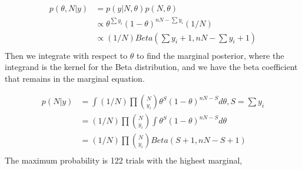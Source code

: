 \documentclass[
]{book}
\theoremstyle{definition}
\theoremstyle{definition}
\theoremstyle{definition}
\theoremstyle{definition}
\theoremstyle{remark}
\begin{document}
\[
\begin{aligned}
p(\theta,N | y) &=  p(y | N,\theta)p(N,\theta) \\
&\propto \theta^{\sum y_i} (1-\theta)^{nN-\sum y_i}(1/N)\\
&\propto (1/N)Beta(\sum y_i+1, nN-\sum y_i +1)\\
\end{aligned}
\]
Then we integrate with respect to \(\theta\) to find the marginal posterior, where the integrand is the kernel for the Beta distribution, and we have the beta coefficient that remains in the marginal equation.

\[
\begin{aligned}
 p(N| y) &= \int (1/N) \prod {N \choose y_i} \theta^{S}(1-\theta)^{nN-S}d\theta, S=\sum y_i \\
 & = (1/N) \prod {N \choose y_i} \int \theta^{S}(1-\theta)^{nN-S}d\theta \\
 & = (1/N) \prod {N \choose y_i} Beta(S+1, nN-S+1)\\
\end{aligned}
\]
The maximum probability is 122 trials with the highest marginal,
\end{document}
